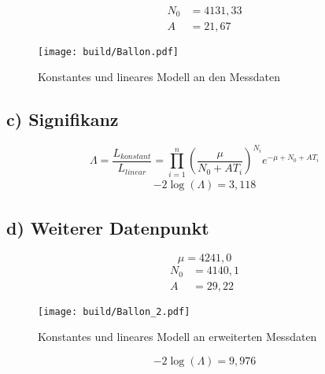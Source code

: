 \begin{align}
    N_0 &= 4131,33\\
    A   &= 21,67
\end{align}

\begin{figure}
    \centering
    \texttt{[image: build/Ballon.pdf]}
    \caption{Konstantes und lineares Modell an den Messdaten}
    \label{fig:Ballon}
\end{figure}
\subsection*{c) Signifikanz}
\begin{equation}
    \Lambda=\frac{L_{konstant}}{L_{linear}}=\prod_{i=1}^n \left(\frac{\mu}{N_0+AT_i}\right)^{N_i} e^{-\mu+N_0+AT_i}
\end{equation}
\begin{align}
    -2\log(\Lambda)=3,118
\end{align}

\subsection*{d) Weiterer Datenpunkt}
\begin{equation}
    \mu=4241,0
\end{equation}
\begin{align}
    N_0 &= 4140,1\\
    A   &= 29,22
\end{align}
\begin{figure}
    \centering
    \texttt{[image: build/Ballon\_2.pdf]}
    \caption{Konstantes und lineares Modell an erweiterten Messdaten}
    \label{fig:Ballon_2}
\end{figure}
\begin{equation}
    -2\log(\Lambda)=9,976
\end{equation}